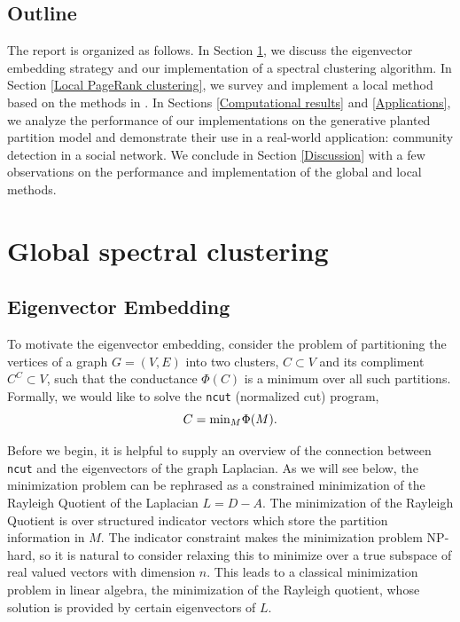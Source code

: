 \documentclass[11pt]{article}
\begin{document}
\subsection*{Outline}

The report is organized as follows. In Section \ref{Global spectral clustering}, we discuss the eigenvector embedding strategy and our implementation of a spectral clustering algorithm. In Section \ref{Local PageRank clustering}, we survey and implement a local method based on the methods in \cite{pagerank_cluster,spielman}. In Sections \ref{Computational results} and \ref{Applications}, we analyze the performance of our implementations on the generative planted partition model and demonstrate their use in a real-world application: community detection in a social network. We conclude in Section \ref{Discussion} with a few observations on the performance and implementation of the global and local methods.


\section{Global spectral clustering}
\label{Global spectral clustering}

\subsection*{Eigenvector Embedding}

To motivate the eigenvector embedding, consider the problem of partitioning the vertices of a graph $G=(V,E)$ into two clusters, $C\subset V$ and its compliment $C^C \subset V$, such that the conductance $\Phi(C)$ is a minimum over all such partitions. Formally, we would like to solve the \texttt{ncut} (normalized cut) program,
\begin{equation}\label{Ncut}
 C = \text{min}_{M}\hspace{.1mm}\Phi(M).
\end{equation}

Before we begin, it is helpful to supply an overview of the connection between {\tt ncut} and the eigenvectors of the graph Laplacian. As we will see below, the minimization problem can be rephrased as a constrained minimization of the Rayleigh Quotient of the Laplacian $L=D-A$. The minimization of the Rayleigh Quotient is over structured indicator vectors which store the partition information in $M$. The indicator constraint makes the minimization problem NP-hard, so it is natural to consider relaxing this to minimize over a true subspace of real valued vectors with dimension $n$. This leads to a classical minimization problem in linear algebra, the minimization of the Rayleigh quotient, whose solution is provided by certain eigenvectors of $L$. 
\end{document}
